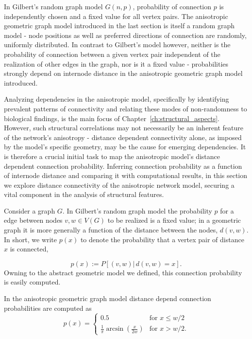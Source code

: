 In Gilbert's random graph model $G(n,p)$, 
probability of connection $p$ is independently chosen and a fixed
value for all vertex pairs. The anisotropic geometric graph model
introduced in the last %
section is itself a random graph model - node positions as well as
preferred directions of connection are randomly, uniformly
distributed. In contrast to Gilbert's model however, neither is the
probability of connection between a given vertex pair independent of
the realization of other edges in the graph, nor is it a fixed value -
probabilities strongly depend on internode distance in the
anisotropic geometric graph model introduced.

Analyzing dependencies in the anisotropic model, specifically by
identifying prevalent patterns of connectivity and relating these
modes of non-randomness to biological findings, is the main focus of
Chapter~\ref{ch:structural_aspects}. However, such structural
correlations may not necessarily be an inherent feature of the
network's anisotropy - distance dependent connectivity alone, as
imposed by the model's specific geometry, may be the cause for
emerging dependencies. It is therefore a crucial initial task to map
the anisotropic model's distance dependent connection
probability. Inferring connection probability as a function of
internode distance and comparing it with computational results, in
this section we explore distance connectivity of the anisotropic
network model, securing a vital component in the analysis of
structural features.

Consider a graph $G$. In Gilbert's random graph model the probability
$p$ for a edge between nodes $v,w \in V(G)$ to be realized is a fixed
value; in a geometric graph it is more generally a function of the
distance between the nodes, $d(v,w)$. In short, we write $p(x)$ to
denote the probability that a vertex pair of distance $x$ is
connected,

\[p(x) := P\left[(v,w)|\,d(v,w)=x\right].\]
Owning to the abstract geometric model we defined, this connection
probability is easily computed.

\begin{proposition} %
In the anisotropic geometric graph model distance depend connection
probabilities are computed as 
\[
p(x) = \begin{cases} 0.5 & \mathrm{for} \,\, x\le w/2 \\
                       \frac{1}{\pi}
                       \operatorname{arcsin}(\frac{x}{2w}) &
                       \mathrm{for} \,\, x >
                       w/2. \end{cases}
\]
\end{proposition} 

